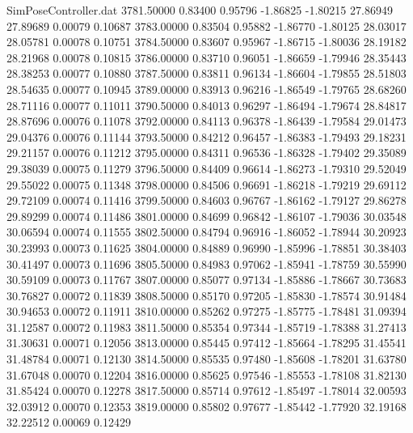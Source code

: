 \begin{filecontents}{SimPoseController.dat}
3781.50000    0.83400    0.95796    -1.86825   -1.80215   27.86949   27.89689    0.00079    0.10687
3783.00000    0.83504    0.95882    -1.86770   -1.80125   28.03017   28.05781    0.00078    0.10751
3784.50000    0.83607    0.95967    -1.86715   -1.80036   28.19182   28.21968    0.00078    0.10815
3786.00000    0.83710    0.96051    -1.86659   -1.79946   28.35443   28.38253    0.00077    0.10880
3787.50000    0.83811    0.96134    -1.86604   -1.79855   28.51803   28.54635    0.00077    0.10945
3789.00000    0.83913    0.96216    -1.86549   -1.79765   28.68260   28.71116    0.00077    0.11011
3790.50000    0.84013    0.96297    -1.86494   -1.79674   28.84817   28.87696    0.00076    0.11078
3792.00000    0.84113    0.96378    -1.86439   -1.79584   29.01473   29.04376    0.00076    0.11144
3793.50000    0.84212    0.96457    -1.86383   -1.79493   29.18231   29.21157    0.00076    0.11212
3795.00000    0.84311    0.96536    -1.86328   -1.79402   29.35089   29.38039    0.00075    0.11279
3796.50000    0.84409    0.96614    -1.86273   -1.79310   29.52049   29.55022    0.00075    0.11348
3798.00000    0.84506    0.96691    -1.86218   -1.79219   29.69112   29.72109    0.00074    0.11416
3799.50000    0.84603    0.96767    -1.86162   -1.79127   29.86278   29.89299    0.00074    0.11486
3801.00000    0.84699    0.96842    -1.86107   -1.79036   30.03548   30.06594    0.00074    0.11555
3802.50000    0.84794    0.96916    -1.86052   -1.78944   30.20923   30.23993    0.00073    0.11625
3804.00000    0.84889    0.96990    -1.85996   -1.78851   30.38403   30.41497    0.00073    0.11696
3805.50000    0.84983    0.97062    -1.85941   -1.78759   30.55990   30.59109    0.00073    0.11767
3807.00000    0.85077    0.97134    -1.85886   -1.78667   30.73683   30.76827    0.00072    0.11839
3808.50000    0.85170    0.97205    -1.85830   -1.78574   30.91484   30.94653    0.00072    0.11911
3810.00000    0.85262    0.97275    -1.85775   -1.78481   31.09394   31.12587    0.00072    0.11983
3811.50000    0.85354    0.97344    -1.85719   -1.78388   31.27413   31.30631    0.00071    0.12056
3813.00000    0.85445    0.97412    -1.85664   -1.78295   31.45541   31.48784    0.00071    0.12130
3814.50000    0.85535    0.97480    -1.85608   -1.78201   31.63780   31.67048    0.00070    0.12204
3816.00000    0.85625    0.97546    -1.85553   -1.78108   31.82130   31.85424    0.00070    0.12278
3817.50000    0.85714    0.97612    -1.85497   -1.78014   32.00593   32.03912    0.00070    0.12353
3819.00000    0.85802    0.97677    -1.85442   -1.77920   32.19168   32.22512    0.00069    0.12429

\end{filecontents}
